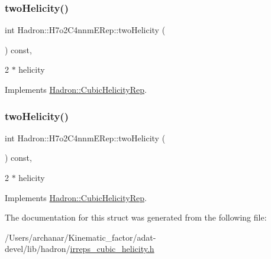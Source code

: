 \subsubsection{\texorpdfstring{twoHelicity()}{twoHelicity()}\hspace{0.1cm}{\footnotesize\ttfamily [2/3]}}
{\footnotesize\ttfamily int Hadron\+::\+H7o2\+C4nnm\+E\+Rep\+::two\+Helicity (\begin{DoxyParamCaption}{ }\end{DoxyParamCaption}) const\hspace{0.3cm}{\ttfamily [inline]}, {\ttfamily [virtual]}}

2 $\ast$ helicity 

Implements \mbox{\hyperlink{structHadron_1_1CubicHelicityRep_af507aa56fc2747eacc8cb6c96db31ecc}{Hadron\+::\+Cubic\+Helicity\+Rep}}.

\mbox{\label{structHadron_1_1H7o2C4nnmERep_a31bbba3df84a0943bb90635b1c99e5f0}} 
\subsubsection{\texorpdfstring{twoHelicity()}{twoHelicity()}\hspace{0.1cm}{\footnotesize\ttfamily [3/3]}}
{\footnotesize\ttfamily int Hadron\+::\+H7o2\+C4nnm\+E\+Rep\+::two\+Helicity (\begin{DoxyParamCaption}{ }\end{DoxyParamCaption}) const\hspace{0.3cm}{\ttfamily [inline]}, {\ttfamily [virtual]}}

2 $\ast$ helicity 

Implements \mbox{\hyperlink{structHadron_1_1CubicHelicityRep_af507aa56fc2747eacc8cb6c96db31ecc}{Hadron\+::\+Cubic\+Helicity\+Rep}}.



The documentation for this struct was generated from the following file\+:\begin{DoxyCompactItemize}
\item 
/\+Users/archanar/\+Kinematic\+\_\+factor/adat-\/devel/lib/hadron/\mbox{\hyperlink{adat-devel_2lib_2hadron_2irreps__cubic__helicity_8h}{irreps\+\_\+cubic\+\_\+helicity.\+h}}\end{DoxyCompactItemize}
